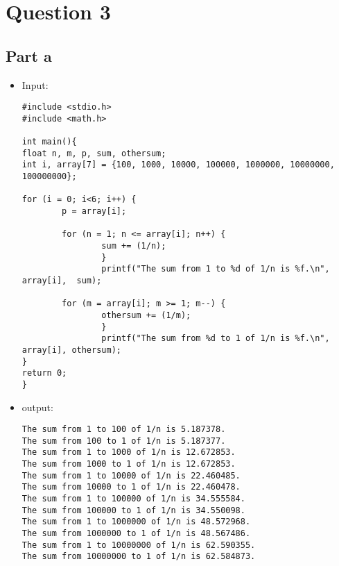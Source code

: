 \documentclass[10pt]{article}
\begin{document}
\section{Question 3}
\subsection{Part a}
\begin{itemize}
\item Input:
\begin{verbatim}
#include <stdio.h>
#include <math.h>

int main(){
float n, m, p, sum, othersum;
int i, array[7] = {100, 1000, 10000, 100000, 1000000, 10000000, 100000000};

for (i = 0; i<6; i++) {
        p = array[i];

        for (n = 1; n <= array[i]; n++) {
                sum += (1/n);
                }
                printf("The sum from 1 to %d of 1/n is %f.\n", array[i],  sum);

        for (m = array[i]; m >= 1; m--) {
                othersum += (1/m);
                }
                printf("The sum from %d to 1 of 1/n is %f.\n", array[i], othersum);
}
return 0;
}
\end{verbatim}
\item output:
\begin{verbatim}
The sum from 1 to 100 of 1/n is 5.187378.
The sum from 100 to 1 of 1/n is 5.187377.
The sum from 1 to 1000 of 1/n is 12.672853.
The sum from 1000 to 1 of 1/n is 12.672853.
The sum from 1 to 10000 of 1/n is 22.460485.
The sum from 10000 to 1 of 1/n is 22.460478.
The sum from 1 to 100000 of 1/n is 34.555584.
The sum from 100000 to 1 of 1/n is 34.550098.
The sum from 1 to 1000000 of 1/n is 48.572968.
The sum from 1000000 to 1 of 1/n is 48.567486.
The sum from 1 to 10000000 of 1/n is 62.590355.
The sum from 10000000 to 1 of 1/n is 62.584873.
\end{verbatim}
\end{itemize}
\end{document}

